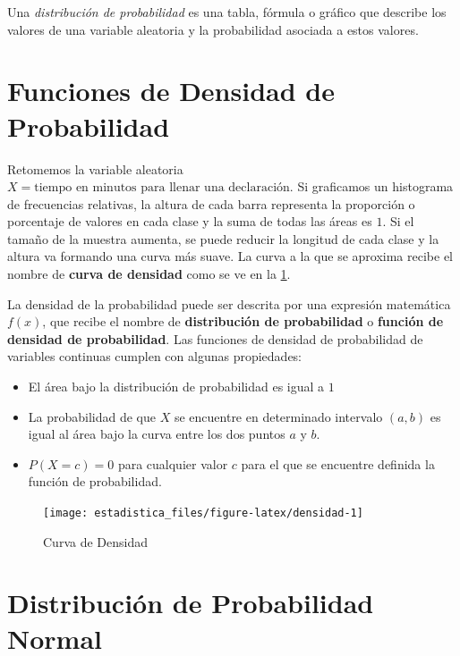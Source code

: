 \documentclass[]{book}
\providecommand{\tightlist}{%
  \setlength{\itemsep}{0pt}\setlength{\parskip}{0pt}}
\begin{document}
Una \emph{distribución de probabilidad} es una tabla, fórmula o gráfico que describe los valores de una variable aleatoria y la probabilidad asociada a estos valores.

\hypertarget{funciones-de-densidad-de-probabilidad}{%
\section{Funciones de Densidad de Probabilidad}\label{funciones-de-densidad-de-probabilidad}}

Retomemos la variable aleatoria \(X= \text{tiempo en minutos para llenar una declaración}\). Si graficamos un histograma de frecuencias relativas, la altura de cada barra representa la proporción o porcentaje de valores en cada clase y la suma de todas las áreas es \(1\). Si el tamaño de la muestra aumenta, se puede reducir la longitud de cada clase y la altura va formando una curva más suave. La curva a la que se aproxima recibe el nombre de \textbf{curva de densidad} como se ve en la \ref{fig:densidad}.

La densidad de la probabilidad puede ser descrita por una expresión matemática \(f\left(x\right)\), que recibe el nombre de \textbf{distribución de probabilidad} o \textbf{función de densidad de probabilidad}. Las funciones de densidad de probabilidad de variables continuas cumplen con algunas propiedades:

\begin{itemize}
\tightlist
\item
  El área bajo la distribución de probabilidad es igual a \(1\)
\item
  La probabilidad de que \(X\) se encuentre en determinado intervalo \(\left(a,b\right)\) es igual al área bajo la curva entre los dos puntos \(a\) y \(b\).
\item
  \(P\left(X=c\right)=0\) para cualquier valor \(c\) para el que se encuentre definida la función de probabilidad.
\end{itemize}

\begin{figure}[h!]

{\centering \texttt{[image: estadistica\_files/figure-latex/densidad-1]} 

}

\caption{Curva de Densidad}\label{fig:densidad}
\end{figure}

\hypertarget{distribucion-de-probabilidad-normal}{%
\section{Distribución de Probabilidad Normal}\label{distribucion-de-probabilidad-normal}}
\end{document}
